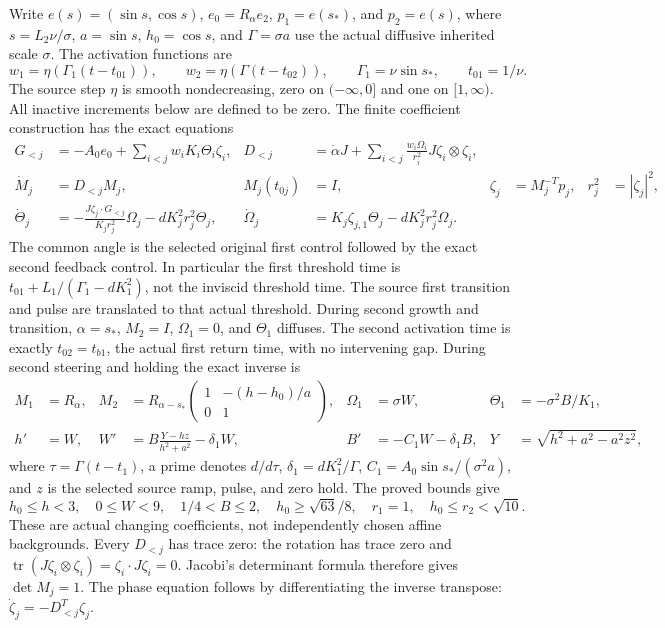 Write $e(s)=(\sin s,\cos s)$, $e_0=R_\alpha e_2$,
$p_1=e(s_*)$, and $p_2=e(s)$, where
$s=L_2\nu/\sigma$, $a=\sin s$, $h_0=\cos s$, and
$\Gamma=\sigma a$ use the actual diffusive inherited scale $\sigma$.
The activation functions are
\[
 w_1=\eta(\Gamma_1(t-t_{01})),\qquad
 w_2=\eta(\Gamma(t-t_{02})),\qquad
 \Gamma_1=\nu\sin s_*,\qquad t_{01}=1/\nu.
\]
The source step $\eta$ is smooth nondecreasing, zero on
$(-\infty,0]$ and one on $[1,\infty)$.
All inactive increments below are defined to be zero. The finite
coefficient construction has the exact equations
\begin{align}
 G_{<j}&=-A_0e_0+\sum_{i<j}w_iK_i\Theta_i\zeta_i,
 &D_{<j}&=\dot\alpha J+
       \sum_{i<j}\frac{w_i\Omega_i}{r_i^2}J\zeta_i\otimes\zeta_i,
 \label{ms:parents}\\
 \dot M_j&=D_{<j}M_j,&M_j(t_{0j})&=I,
 &\zeta_j&=M_j^{-T}p_j,&r_j^2&=|\zeta_j|^2,\nonumber\\
 \dot\Theta_j&=-\frac{J\zeta_j\cdot G_{<j}}{K_jr_j^2}\Omega_j
                   -dK_j^2r_j^2\Theta_j,
 &\dot\Omega_j&=K_j\zeta_{j,1}\Theta_j-dK_j^2r_j^2\Omega_j.
 \label{ms:amplitudes}
\end{align}
The common angle is the selected original first control followed by
the exact second feedback control. In particular the first threshold
time is $t_{01}+L_1/(\Gamma_1-dK_1^2)$, not the inviscid
threshold time. The source first transition and pulse are translated
to that actual threshold. During second growth and transition,
$\alpha=s_*$, $M_2=I$, $\Omega_1=0$, and $\Theta_1$ diffuses.
The second activation time is exactly $t_{02}=t_{b1}$, the actual
first return time, with no intervening gap.
During second steering and holding the exact inverse is
\begin{align}
 M_1&=R_\alpha,&
 M_2&=R_{\alpha-s_*}
       \begin{pmatrix}1&-(h-h_0)/a\\0&1\end{pmatrix},
 &\Omega_1&=\sigma W,&\Theta_1&=-\sigma^2B/K_1,
 \label{ms:M}\\
 h'&=W,&
 W'&=B\frac{Y-hz}{h^2+a^2}-\delta_1W,&
 B'&=-C_1W-\delta_1B,&
 Y&=\sqrt{h^2+a^2-a^2z^2},\nonumber
\end{align}
where $\tau=\Gamma(t-t_1)$, a prime denotes $d/d\tau$,
$\delta_1=dK_1^2/\Gamma$,
$C_1=A_0\sin s_*/(\sigma^2a)$, and $z$ is the selected
source ramp, pulse, and zero hold. The proved bounds give
\[
 h_0\leq h<3,\quad 0\leq W<9,\quad
 1/4<B\leq2,\quad h_0\geq\sqrt{63}/8,\quad
 r_1=1,\quad h_0\leq r_2<\sqrt{10}.
\]
These are actual changing coefficients, not independently chosen
affine backgrounds. Every $D_{<j}$ has trace zero: the rotation
has trace zero and
$\operatorname{tr}(J\zeta_i\otimes\zeta_i)=\zeta_i\cdot J\zeta_i=0$.
Jacobi's determinant formula therefore gives $\det M_j=1$.
The phase equation follows by differentiating the inverse transpose:
$\dot\zeta_j=-D_{<j}^T\zeta_j$.

